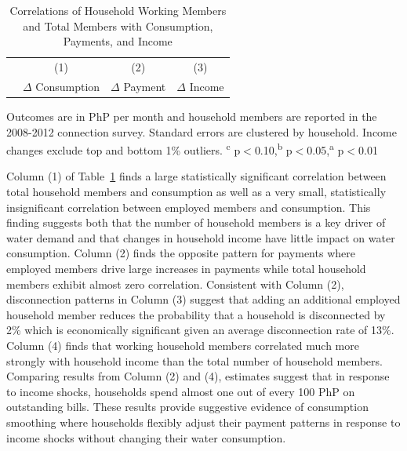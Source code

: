 \documentclass[12pt]{article}
\begin{document}
\begin{table}[!ht]
\small
\centering
\begin{threeparttable}
\caption{Correlations of Household Working Members and Total Members with Consumption, Payments, and Income}\label{table:panelanalysis}
\vspace{-2mm}
\begin{tabular}{lccc}
\toprule
 & \small (1) & \small (2) & \small (3)  \\
 & \small $\Delta$ Consumption & \small $\Delta$ Payment & \small $\Delta$ Income \\[.5em]
 \toprule

\bottomrule
\end{tabular}
\begin{tablenotes}
\footnotesize
\item Outcomes are in PhP per month and household members are reported in the 2008-2012 connection survey.  Standard errors are clustered by household.  Income changes exclude top and bottom 1\% outliers. \textsuperscript{c} p$<$0.10,\textsuperscript{b} p$<$0.05,\textsuperscript{a} p$<$0.01 
\end{tablenotes}
\end{threeparttable}
\end{table}

Column (1) of Table~\ref{table:panelanalysis} finds a large statistically significant correlation between total household members and consumption as well as a very small, statistically insignificant correlation between employed members and consumption.  This finding suggests both that the number of household members is a key driver of water demand and that changes in household income have little impact on water consumption.  Column (2) finds the opposite pattern for payments where employed members drive large increases in payments while total household members exhibit almost zero correlation.  Consistent with Column (2), disconnection patterns in Column (3) suggest that adding an additional employed household member reduces the probability that a household is disconnected by 2\% which is economically significant given an average disconnection rate of 13\%.  Column (4) finds that working household members correlated much more strongly with household income than the total number of household members.  Comparing results from Column (2) and (4), estimates suggest that in response to income shocks, households spend almost one out of every 100 PhP on outstanding bills.  These results provide suggestive evidence of consumption smoothing where households flexibly adjust their payment patterns in response to income shocks without changing their water consumption.  
\end{document}
